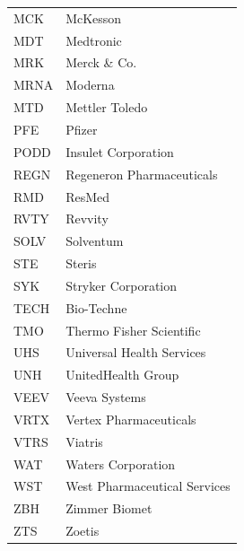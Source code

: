\documentclass[11pt,a4paper]{article}
\begin{document}
{\begin{longtable}{lp{11cm}}
MCK & McKesson \\
MDT & Medtronic \\
MRK & Merck \& Co. \\
MRNA & Moderna \\
MTD & Mettler Toledo \\
PFE & Pfizer \\
PODD & Insulet Corporation \\
REGN & Regeneron Pharmaceuticals \\
RMD & ResMed \\
RVTY & Revvity \\
SOLV & Solventum \\
STE & Steris \\
SYK & Stryker Corporation \\
TECH & Bio-Techne \\
TMO & Thermo Fisher Scientific \\
UHS & Universal Health Services \\
UNH & UnitedHealth Group \\
VEEV & Veeva Systems \\
VRTX & Vertex Pharmaceuticals \\
VTRS & Viatris \\
WAT & Waters Corporation \\
WST & West Pharmaceutical Services \\
ZBH & Zimmer Biomet \\
ZTS & Zoetis \\
\hline
\end{longtable}}
\end{document}
